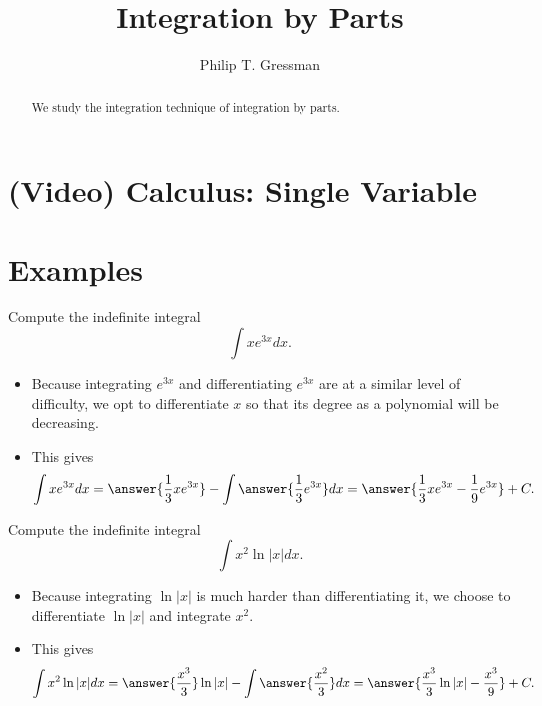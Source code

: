 \documentclass{ximera}
\title{Integration by Parts}
\author{Philip T. Gressman}
\begin{document}
\begin{abstract}
We study the integration technique of integration by parts.
\end{abstract}
\maketitle

\section*{(Video) Calculus: Single Variable}


\section*{Examples}

\begin{example}
Compute the indefinite integral
\[ \int x e^{3x} dx. \]
\begin{itemize}
\item Because integrating $e^{3x}$ and differentiating $e^{3x}$ are at a similar level of difficulty, we opt to differentiate $x$ so that its degree as a polynomial will be decreasing.
\item This gives
\[ \int x e^{3x} dx = \answer{\frac{1}{3} x e^{3x}} - \int \answer{ \frac{1}{3} e^{3x} } dx = \answer{ \frac{1}{3} x e^{3x} - \frac{1}{9} e^{3x} } + C. \]
\end{itemize}
\end{example}


\begin{example}
Compute the indefinite integral
\[ \int x^2 \ln |x| dx. \]
\begin{itemize}
\item Because integrating $\ln |x|$ is much harder than differentiating it, we choose to differentiate $\ln |x|$ and integrate $x^2$. 
\item This gives
\[ \int x^2 \ln |x| dx = \answer{\frac{x^3}{3}} \ln |x| - \int \answer{\frac{x^2}{3}} dx = \answer{ \frac{x^3}{3} \ln |x| - \frac{x^3}{9}} + C. \]
\end{itemize}
\end{example}
\end{document}

